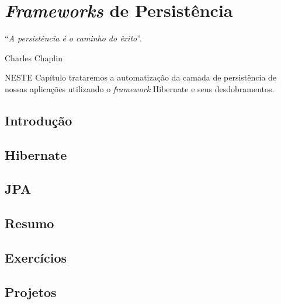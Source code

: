 \chapter{\textit{Frameworks} de Persistência}\label{cap:frameworksPersistencia}
\epigraph{``\textit{A persistência é o caminho do êxito}''.}{Charles Chaplin}

\lettrine[lines=4, lhang=0.1, lraise=0, loversize=0.2, findent=0.1em]{\textcolor{corAzulTema}{N}}{ESTE} Capítulo trataremos a automatização da camada de persistência de nossas aplicações utilizando o \textit{framework} Hibernate e seus desdobramentos.

\vfill

\section{Introdução}

\section{Hibernate}

\section{JPA}

\section{Resumo}

\section{Exercícios}

\section{Projetos}

